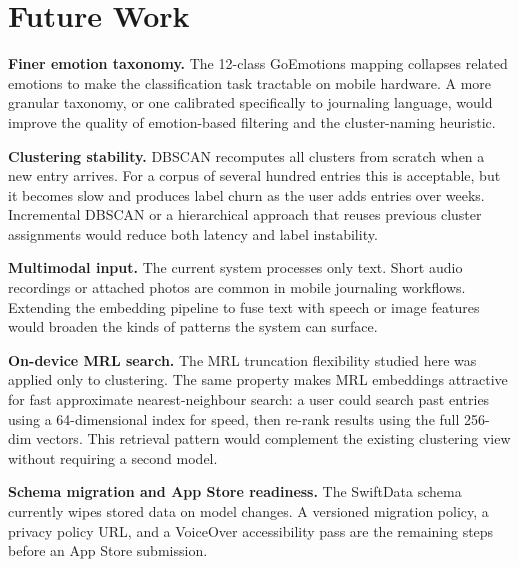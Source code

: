 \section{Future Work}

\textbf{Finer emotion taxonomy.} The 12-class GoEmotions mapping collapses related emotions to make the classification task tractable on mobile hardware. A more granular taxonomy, or one calibrated specifically to journaling language, would improve the quality of emotion-based filtering and the cluster-naming heuristic.

\textbf{Clustering stability.} DBSCAN recomputes all clusters from scratch when a new entry arrives. For a corpus of several hundred entries this is acceptable, but it becomes slow and produces label churn as the user adds entries over weeks. Incremental DBSCAN or a hierarchical approach that reuses previous cluster assignments would reduce both latency and label instability.

\textbf{Multimodal input.} The current system processes only text. Short audio recordings or attached photos are common in mobile journaling workflows. Extending the embedding pipeline to fuse text with speech or image features would broaden the kinds of patterns the system can surface.

\textbf{On-device MRL search.} The MRL truncation flexibility studied here was applied only to clustering. The same property makes MRL embeddings attractive for fast approximate nearest-neighbour search: a user could search past entries using a 64-dimensional index for speed, then re-rank results using the full 256-dim vectors. This retrieval pattern would complement the existing clustering view without requiring a second model.

\textbf{Schema migration and App Store readiness.} The SwiftData schema currently wipes stored data on model changes. A versioned migration policy, a privacy policy URL, and a VoiceOver accessibility pass are the remaining steps before an App Store submission.